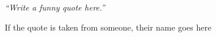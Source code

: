 \documentclass[a4paper, 11pt, oneside]{Thesis}  %
\begin{document}
%
%
%
% 
% 
% 
% 
% 
% 
% 
% 

\pagestyle{empty}  %

\null\vfill
\textit{``Write a funny quote here.''}

\begin{flushright}
If the quote is taken from someone, their name goes here
\end{flushright}
\end{document}
